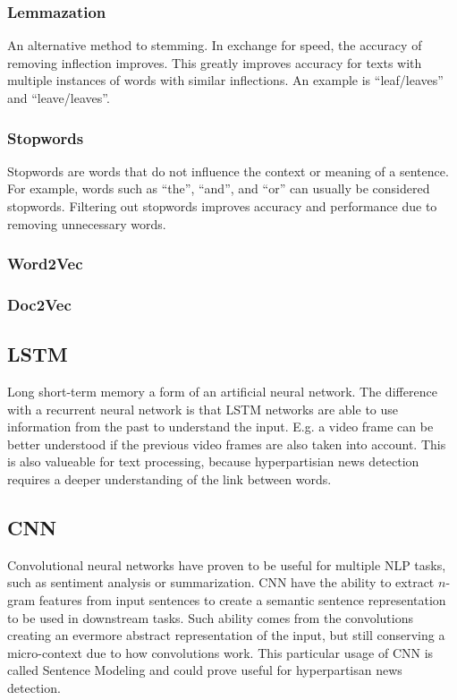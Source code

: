 \documentclass{article}
\begin{document}
\subsubsection{Lemmazation}
An alternative method to stemming.
In exchange for speed, the accuracy of removing inflection improves.
This greatly improves accuracy for texts with multiple instances of words with similar inflections.
An example is ``leaf/leaves'' and ``leave/leaves''.

\subsubsection{Stopwords}
Stopwords are words that do not influence the context or meaning of a sentence.
For example, words such as ``the'', ``and'', and ``or'' can usually be considered stopwords.
Filtering out stopwords improves accuracy and performance due to removing unnecessary words.


\subsubsection{Word2Vec}
\subsubsection{Doc2Vec}


\subsection{LSTM}
Long short-term memory a form of an artificial neural network. The difference with a recurrent neural network is that LSTM networks are able to use information from the past to understand the input. E.g. a video frame can be better understood if the previous video frames are also taken into account. This is also valueable for text processing, because hyperpartisian news detection requires a deeper understanding of the link between words.

\subsection{CNN}
Convolutional  neural networks have proven to be useful for multiple NLP tasks, such as sentiment analysis or summarization.
CNN have the ability to extract $n$-gram features from input sentences to create a semantic sentence representation to be used in downstream tasks.
Such ability comes from the convolutions creating an evermore abstract representation of the input, but still conserving a micro-context due to how convolutions work.
This particular usage of CNN is called Sentence Modeling and could prove useful for hyperpartisan news detection.
\end{document}
